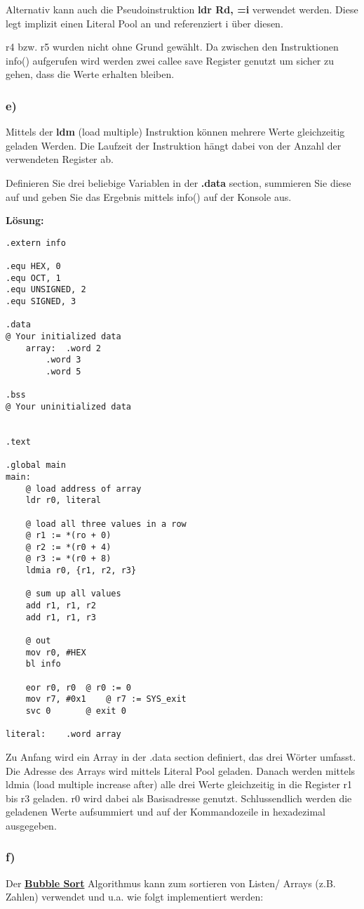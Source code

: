 \documentclass[12pt]{article}
\begin{document}
Alternativ kann auch die Pseudoinstruktion \textbf{ldr Rd, =i} verwendet werden. Diese legt implizit einen Literal Pool an und
referenziert i über diesen.

r4 bzw. r5 wurden nicht ohne Grund gewählt. Da zwischen den Instruktionen info() aufgerufen wird werden zwei callee save Register
genutzt um sicher zu gehen, dass die Werte erhalten bleiben.


\subsubsection{e)}
Mittels der \textbf{ldm} (load multiple) Instruktion können mehrere Werte gleichzeitig geladen Werden. Die Laufzeit der Instruktion hängt
dabei von der Anzahl der verwendeten Register ab.

Definieren Sie drei beliebige Variablen in der \textbf{.data} section, summieren Sie diese auf und geben Sie das Ergebnis mittels info()
auf der Konsole aus.

\textbf{Lösung:}
\begin{lstlisting}
.extern info

.equ HEX, 0
.equ OCT, 1
.equ UNSIGNED, 2
.equ SIGNED, 3

.data
@ Your initialized data
	array:	.word 2
		.word 3
		.word 5

.bss
@ Your uninitialized data


.text

.global main
main:
	@ load address of array
	ldr r0, literal
	
	@ load all three values in a row
	@ r1 := *(ro + 0)
	@ r2 := *(r0 + 4)
	@ r3 := *(r0 + 8)
	ldmia r0, {r1, r2, r3}

	@ sum up all values
	add r1, r1, r2
	add r1, r1, r3
	
	@ out
	mov r0, #HEX
	bl info

	eor r0, r0	@ r0 := 0
	mov r7, #0x1	@ r7 := SYS_exit
	svc 0		@ exit 0

literal:	.word array
\end{lstlisting}
Zu Anfang wird ein Array in der .data section definiert, das drei Wörter umfasst.
Die Adresse des Arrays wird mittels Literal Pool geladen.
Danach werden mittels ldmia (load multiple increase after) alle drei Werte gleichzeitig
in die Register r1 bis r3 geladen. r0 wird dabei als Basisadresse genutzt.
Schlussendlich werden die geladenen Werte aufsummiert und auf der Kommandozeile in 
hexadezimal ausgegeben.


\subsubsection{f)}
Der \href{https://en.wikipedia.org/wiki/Bubble\_sort}{\textbf{Bubble Sort}} 
Algorithmus kann zum sortieren von Listen/ Arrays (z.B. Zahlen) verwendet 
und u.a. wie folgt implementiert werden:
\end{document}
